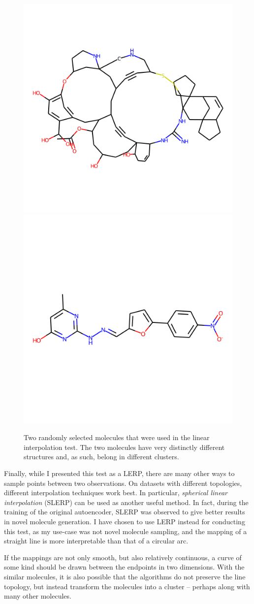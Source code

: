 \begin{figure}[!h]
	\centering
	\includegraphics[width=0.49\columnwidth]{figures/random_mol1}
	\includegraphics[width=0.49\columnwidth]{figures/random_mol2}
	\caption{Two randomly selected molecules that were used in the linear interpolation test. The two molecules have very distinctly different structures and, as such, belong in different clusters.}
	\label{fig:random_mol}
\end{figure}

Finally, while I presented this test as a LERP, there are many other ways to sample points between two observations. On datasets with different topologies, different interpolation techniques work best. In particular, \textit{spherical linear interpolation} (SLERP) can be used as another useful method. In fact, during the training of the original autoencoder, SLERP was observed to give better results in novel molecule generation. \cite{bib:thesis} I have chosen to use LERP instead for conducting this test, as my use-case was not novel molecule sampling, and the mapping of a straight line is more interpretable than that of a circular arc.

If the mappings are not only smooth, but also relatively continuous, a curve of some kind should be drawn between the endpoints in two dimensions. With the similar molecules, it is also possible that the algorithms do not preserve the line topology, but instead transform the molecules into a cluster -- perhaps along with many other molecules.

